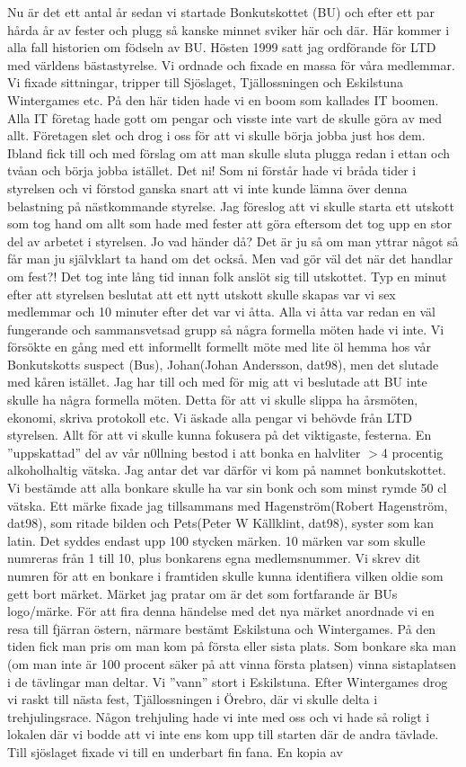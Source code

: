 Nu är det ett antal år sedan vi startade Bonkutskottet (BU) och efter ett par hårda år av fester och plugg så kanske minnet sviker här och där. Här kommer i alla fall historien om födseln av BU. Hösten 1999 satt jag ordförande för LTD med världens bästastyrelse. Vi ordnade och fixade en massa för våra medlemmar. Vi fixade sittningar, tripper till Sjöslaget, Tjällossningen och Eskilstuna Wintergames etc. På den här tiden hade vi en boom som kallades IT boomen. Alla IT företag hade gott om pengar och visste inte vart de skulle göra av med allt. Företagen slet och drog i oss för att vi skulle börja jobba just hos dem. Ibland fick till och med förslag om att man skulle sluta plugga redan i ettan och tvåan och börja jobba istället. Det ni! Som ni förstår hade vi bråda tider i styrelsen och vi förstod ganska snart att vi inte kunde lämna över denna belastning på nästkommande styrelse. Jag föreslog att vi skulle starta ett utskott som tog hand om allt som hade med fester att göra eftersom det tog upp en stor del av arbetet i styrelsen. Jo vad händer då? Det är ju så om man yttrar något så får man ju självklart ta hand om det också. Men vad gör väl det när det handlar om fest?! Det tog inte lång tid innan folk anslöt sig till utskottet. Typ en minut efter att styrelsen beslutat att ett nytt utskott skulle skapas var vi sex medlemmar och 10 minuter efter det var vi åtta. Alla vi åtta var redan en väl fungerande och sammansvetsad grupp så några formella möten hade vi inte. Vi försökte en gång med ett informellt formellt möte med lite öl hemma hos vår Bonkutskotts suspect (Bus), Johan(Johan Andersson, dat98), men det slutade med kåren istället. Jag har till och med för mig att vi beslutade att BU inte skulle ha några formella möten. Detta för att vi skulle slippa ha årsmöten, ekonomi, skriva protokoll etc. Vi äskade alla pengar vi behövde från LTD styrelsen. Allt för att vi skulle kunna fokusera på det viktigaste, festerna. En ”uppskattad” del av vår n0llning bestod i att bonka en halvliter \(>\)4 procentig alkoholhaltig vätska. Jag antar det var därför vi kom på namnet bonkutskottet. Vi bestämde att alla bonkare skulle ha var sin bonk och som minst rymde 50 cl vätska. Ett märke fixade jag tillsammans med Hagenström(Robert Hagenström, dat98), som ritade bilden och Pets(Peter W Källklint, dat98), syster som kan latin. Det syddes endast upp 100 stycken märken. 10 märken var som skulle numreras från 1 till 10, plus bonkarens egna medlemsnummer. Vi skrev dit numren för att en bonkare i framtiden skulle kunna identifiera vilken oldie som gett bort märket. Märket jag pratar om är det som fortfarande är BUs logo/märke. För att fira denna händelse med det nya märket anordnade vi en resa till fjärran östern, närmare bestämt Eskilstuna och Wintergames. På den tiden fick man pris om man kom på första eller sista plats. Som bonkare ska man (om man inte är 100 procent säker på att vinna första platsen) vinna sistaplatsen i de tävlingar man deltar. Vi ”vann” stort i Eskilstuna. Efter Wintergames drog vi raskt till nästa fest, Tjällossningen i Örebro, där vi skulle delta i trehjulingsrace. Någon trehjuling hade vi inte med oss och vi hade så roligt i lokalen där vi bodde att vi inte ens kom upp till starten där de andra tävlade. Till sjöslaget fixade vi till en underbart fin fana. En kopia av 